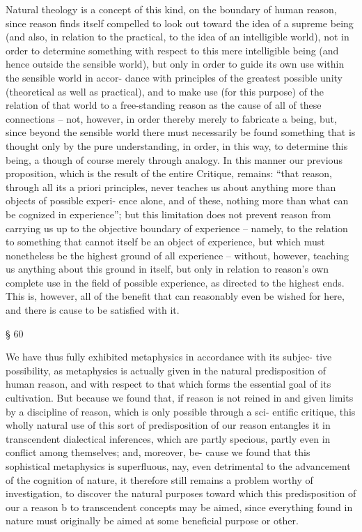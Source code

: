 Natural theology is a concept of this kind, on the boundary of human
reason, since reason ﬁnds itself compelled to look out toward the idea of
a supreme being (and also, in relation to the practical, to the idea of an
intelligible world), not in order to determine something with respect to
this mere intelligible being (and hence outside the sensible world), but
only in order to guide its own use within the sensible world in accor-
dance with principles of the greatest possible unity (theoretical as well
as practical), and to make use (for this purpose) of the relation of that
world to a free-standing reason as the cause of all of these connections –
not, however, in order thereby merely to fabricate a being, but, since
beyond the sensible world there must necessarily be found something
that is thought only by the pure understanding, in order, in this way, to
determine this being, a though of course merely through analogy.
In this manner our previous proposition, which is the result of the
entire Critique, remains: “that reason, through all its a priori principles,
never teaches us about anything more than objects of possible experi-
ence alone, and of these, nothing more than what can be cognized in
experience”; but this limitation does not prevent reason from carrying
us up to the objective boundary of experience – namely, to the relation to
something that cannot itself be an object of experience, but which must
nonetheless be the highest ground of all experience – without, however,
teaching us anything about this ground in itself, but only in relation to
reason’s own complete use in the ﬁeld of possible experience, as directed
to the highest ends. This is, however, all of the beneﬁt that can reasonably
even be wished for here, and there is cause to be satisﬁed with it.

§ 60

We have thus fully exhibited metaphysics in accordance with its subjec-
tive possibility, as metaphysics is actually given in the natural predisposition
of human reason, and with respect to that which forms the essential goal
of its cultivation. But because we found that, if reason is not reined in and
given limits by a discipline of reason, which is only possible through a sci-
entiﬁc critique, this wholly natural use of this sort of predisposition of our
reason entangles it in transcendent dialectical inferences, which are partly
specious, partly even in conﬂict among themselves; and, moreover, be-
cause we found that this sophistical metaphysics is superﬂuous, nay, even
detrimental to the advancement of the cognition of nature, it therefore
still remains a problem worthy of investigation, to discover the natural
purposes toward which this predisposition of our a reason b to transcendent
concepts may be aimed, since everything found in nature must originally
be aimed at some beneﬁcial purpose or other.

